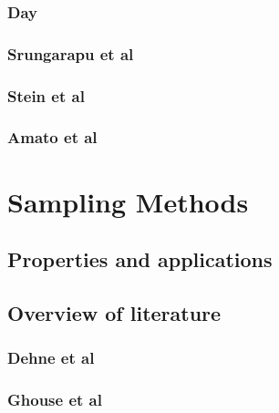 \documentclass[10pt,a4paper,draft]{report}
\begin{document}
\subsubsection{Day}
\subsubsection{Srungarapu et al}
\subsubsection{Stein et al}



\subsubsection{Amato et al}



\section{Sampling Methods}
\subsection{Properties and applications}
\subsection{Overview of literature}
\subsubsection{Dehne et al}
\subsubsection{Ghouse et al}


	
\end{document}
